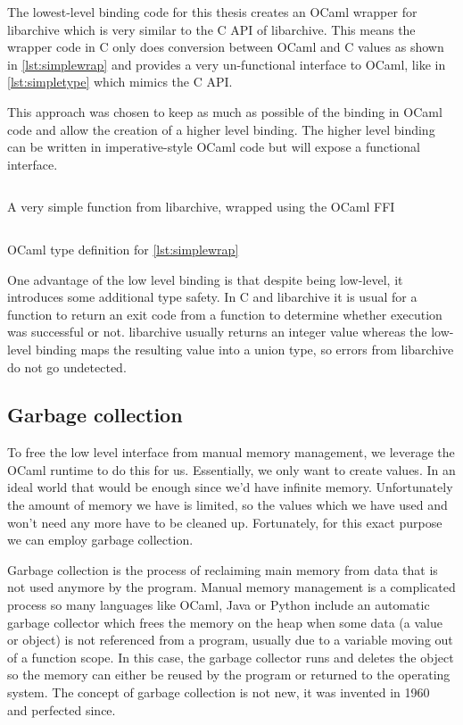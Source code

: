 \documentclass[parskip=half]{scrreprt}
\begin{document}
The lowest-level binding code for this thesis creates an OCaml wrapper for
libarchive which is very similar to the C API of libarchive. This means the
wrapper code in C only does conversion between OCaml and C values as shown in
\autoref{lst:simplewrap} and provides a very un-functional interface to OCaml,
like in \autoref{lst:simpletype} which mimics the C API.

This approach was chosen to keep as much as possible of the binding in OCaml
code and allow the creation of a higher level binding. The higher level binding
can be written in imperative-style OCaml code but will expose a functional
interface.

\begin{listing}[h]
  \inputminted[linenos]{c}{simple-wrap.c}
  \caption{A very simple function from libarchive, wrapped using the OCaml FFI}
  \label{lst:simplewrap}
\end{listing}

\begin{listing}[h]
  \inputminted[linenos]{ocaml}{simple-wrap.ml}
  \caption{OCaml type definition for \autoref{lst:simplewrap}}
  \label{lst:simpletype}
\end{listing}

One advantage of the low level binding is that despite being low-level, it
introduces some additional type safety. In C and libarchive it is usual for a
function to return an exit code from a function to determine whether execution
was successful or not. libarchive usually returns an integer value whereas the
low-level binding maps the resulting value into a union type, so errors from
libarchive do not go undetected.

\subsection{Garbage collection}
\label{sec:gc}

To free the low level interface from manual memory management, we leverage the
OCaml runtime to do this for us. Essentially, we only want to create values. In
an ideal world that would be enough since we'd have infinite memory.
Unfortunately the amount of memory we have is limited, so the values which we
have used and won't need any more have to be cleaned up. Fortunately, for this
exact purpose we can employ garbage collection.

Garbage collection is the process of reclaiming main memory from data that is
not used anymore by the program. Manual memory management is a complicated
process so many languages like OCaml, Java or Python include an automatic
garbage collector which frees the memory on the heap when some data (a value or
object) is not referenced from a program, usually due to a variable moving out
of a function scope. In this case, the garbage collector runs and deletes the
object so the memory can either be reused by the program or returned to the
operating system. The concept of garbage collection is not new, it was invented
in 1960~\cite{mccarthy1960recursive} and perfected since.
\end{document}
